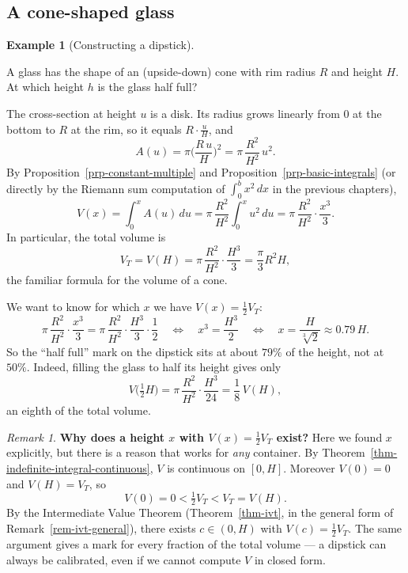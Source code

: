 \documentclass[
  letterpaper,
  DIV=11,
  numbers=noendperiod]{scrreprt}
\theoremstyle{plain}
\theoremstyle{plain}
\theoremstyle{definition}
\theoremstyle{definition}
\theoremstyle{definition}
\newtheorem{example}{Example}[chapter]
\theoremstyle{plain}
\theoremstyle{plain}
\theoremstyle{remark}
\newtheorem{refremark}{Remark}[chapter]
\begin{document}
\subsection{A cone-shaped glass}\label{a-cone-shaped-glass}

\begin{example}[Constructing a
dipstick]\protect\hypertarget{exm-dipstick-cone}{}\label{exm-dipstick-cone}

A glass has the shape of an (upside-down) cone with rim radius \(R\) and
height \(H\). At which height \(h\) is the glass half full?

The cross-section at height \(u\) is a disk. Its radius grows linearly
from \(0\) at the bottom to \(R\) at the rim, so it equals
\(R\cdot\frac{u}{H}\), and \[
A(u) = \pi\Big(\frac{R\,u}{H}\Big)^2 = \pi\,\frac{R^2}{H^2}\,u^2 .
\] By Proposition~\ref{prp-constant-multiple} and
Proposition~\ref{prp-basic-integrals} (or directly by the Riemann sum
computation of \(\int_0^b x^2\,dx\) in the previous chapters), \[
V(x) = \int_0^x A(u)\,du = \pi\,\frac{R^2}{H^2}\int_0^x u^2\,du = \pi\,\frac{R^2}{H^2}\cdot\frac{x^3}{3}.
\] In particular, the total volume is \[
V_T = V(H) = \pi\,\frac{R^2}{H^2}\cdot\frac{H^3}{3} = \frac{\pi}{3}R^2H,
\] the familiar formula for the volume of a cone.

We want to know for which \(x\) we have \(V(x) = \frac12 V_T\): \[
\pi\,\frac{R^2}{H^2}\cdot\frac{x^3}{3} = \pi\,\frac{R^2}{H^2}\cdot\frac{H^3}{3}\cdot\frac12
\quad \Leftrightarrow \quad x^3 = \frac{H^3}{2}
\quad \Leftrightarrow \quad x = \frac{H}{\sqrt[3]{2}} \approx 0.79\,H .
\] So the ``half full'' mark on the dipstick sits at about \(79\%\) of
the height, not at \(50\%\). Indeed, filling the glass to half its
height gives only \[
V\big(\tfrac12 H\big) = \pi\,\frac{R^2}{H^2}\cdot\frac{H^3}{24} = \frac18\,V(H),
\] an eighth of the total volume.

\end{example}

\begin{refremark}
\textbf{Why does a height \(x\) with \(V(x) = \frac12 V_T\) exist?} Here
we found \(x\) explicitly, but there is a reason that works for
\emph{any} container. By
Theorem~\ref{thm-indefinite-integral-continuous}, \(V\) is continuous on
\([0,H]\). Moreover \(V(0) = 0\) and \(V(H) = V_T\), so \[
V(0) = 0 < \tfrac12 V_T < V_T = V(H).
\] By the Intermediate Value Theorem (Theorem~\ref{thm-ivt}, in the
general form of Remark~\ref{rem-ivt-general}), there exists
\(c\in(0,H)\) with \(V(c) = \frac12 V_T\). The same argument gives a
mark for every fraction of the total volume --- a dipstick can always be
calibrated, even if we cannot compute \(V\) in closed form.

\label{rem-dipstick-existence}

\end{refremark}
\end{document}
